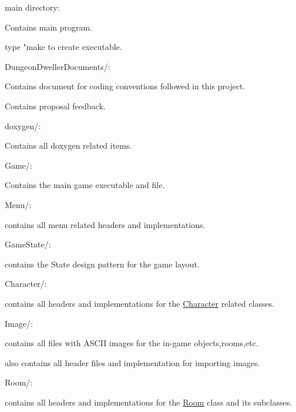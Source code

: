 main directory\-:
\begin{DoxyItemize}
\item Contains main program.
\item type "make to create executable.
\end{DoxyItemize}

Dungeon\-Dweller\-Documents/\-:
\begin{DoxyItemize}
\item Contains document for coding conventions followed in this project.
\item Contains proposal feedback.
\end{DoxyItemize}

doxygen/\-:
\begin{DoxyItemize}
\item Contains all doxygen related items.
\end{DoxyItemize}

Game/\-:
\begin{DoxyItemize}
\item Contains the main game executable and file.
\end{DoxyItemize}

Menu/\-:
\begin{DoxyItemize}
\item contains all menu related headers and implementations.
\end{DoxyItemize}

Game\-State/\-:
\begin{DoxyItemize}
\item contains the State design pattern for the game layout.
\end{DoxyItemize}

Character/\-:
\begin{DoxyItemize}
\item contains all headers and implementations for the \hyperlink{classCharacter}{Character} related classes.
\end{DoxyItemize}

Image/\-:
\begin{DoxyItemize}
\item contains all files with A\-S\-C\-I\-I images for the in-\/game objects,rooms,etc.
\item also contains all header files and implementation for importing images.
\end{DoxyItemize}

Room/\-:
\begin{DoxyItemize}
\item contains all headers and implementations for the \hyperlink{classRoom}{Room} class and its subclasses.
\end{DoxyItemize}

